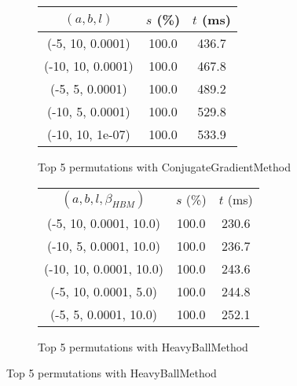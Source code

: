 \begin{figure}[H]
\begin{subfigure}[ht]{.5\textwidth}
\begin{tabular}{|c|c|c|}
\hline
\rowcolor{gray!25}
$(a,b,l)$ & $s$ (\%) & $t$ (ms) \\
\hline
(-5, 10, 0.0001) & 100.0 & 436.7 \\
(-10, 10, 0.0001) & 100.0 & 467.8 \\
(-5, 5, 0.0001) & 100.0 & 489.2 \\
(-10, 5, 0.0001) & 100.0 & 529.8 \\
(-10, 10, 1e-07) & 100.0 & 533.9 \\
\hline
\end{tabular}
\caption{Top 5 permutations with ConjugateGradientMethod}
\label{subfig:param_comp_MatrixSquareSum_ConjugateGradientMethod_GoldenSectionSearch}
\end{subfigure}
\hfill
\begin{subfigure}[ht]{.5\textwidth}
\begin{tabular}{|c|c|c|}
\hline
\rowcolor{gray!25}
\multicolumn{3}{|c|}{HeavyBallMethod} \\
\hline
\rowcolor{gray!25}
$(a,b,l,\beta_{HBM})$ & $s$ (\%) & $t$ (ms) \\
\hline
(-5, 10, 0.0001, 10.0) & 100.0 & 230.6 \\
(-10, 5, 0.0001, 10.0) & 100.0 & 236.7 \\
(-10, 10, 0.0001, 10.0) & 100.0 & 243.6 \\
(-5, 10, 0.0001, 5.0) & 100.0 & 244.8 \\
(-5, 5, 0.0001, 10.0) & 100.0 & 252.1 \\
\hline
\end{tabular}
\caption{Top 5 permutations with HeavyBallMethod}
\label{subfig:param_comp_MatrixSquareSum_HeavyBallMethod_GoldenSectionSearch}
\end{subfigure}
\end{figure}

